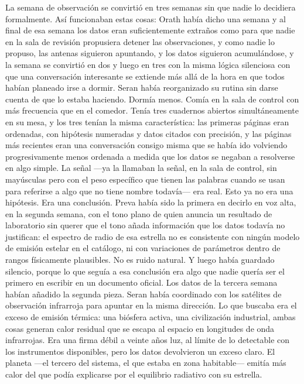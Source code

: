 \documentclass[11pt,a5paper,twoside]{book}
\begin{document}
La semana de observación se convirtió en tres semanas sin que nadie lo decidiera formalmente.
Así funcionaban estas cosas: Orath había dicho una semana y al final de esa semana los datos eran suficientemente extraños como para que nadie en la sala de revisión propusiera detener las observaciones, y como nadie lo propuso, las antenas siguieron apuntando, y los datos siguieron acumulándose, y la semana se convirtió en dos y luego en tres con la misma lógica silenciosa con que una conversación interesante se extiende más allá de la hora en que todos habían planeado irse a dormir.
Seran había reorganizado su rutina sin darse cuenta de que lo estaba haciendo. Dormía menos. Comía en la sala de control con más frecuencia que en el comedor. Tenía tres cuadernos abiertos simultáneamente en su mesa, y los tres tenían la misma característica: las primeras páginas eran ordenadas, con hipótesis numeradas y datos citados con precisión, y las páginas más recientes eran una conversación consigo misma que se había ido volviendo progresivamente menos ordenada a medida que los datos se negaban a resolverse en algo simple.
La señal —ya la llamaban la señal, en la sala de control, sin mayúsculas pero con el peso específico que tienen las palabras cuando se usan para referirse a algo que no tiene nombre todavía— era real.
Esto ya no era una hipótesis. Era una conclusión.
Preva había sido la primera en decirlo en voz alta, en la segunda semana, con el tono plano de quien anuncia un resultado de laboratorio sin querer que el tono añada información que los datos todavía no justifican: el espectro de radio de esa estrella no es consistente con ningún modelo de emisión estelar en el catálogo, ni con variaciones de parámetros dentro de rangos físicamente plausibles. No es ruido natural. Y luego había guardado silencio, porque lo que seguía a esa conclusión era algo que nadie quería ser el primero en escribir en un documento oficial.
Los datos de la tercera semana habían añadido la segunda pieza.
Seran había coordinado con los satélites de observación infrarroja para apuntar en la misma dirección. Lo que buscaba era el exceso de emisión térmica: una biósfera activa, una civilización industrial, ambas cosas generan calor residual que se escapa al espacio en longitudes de onda infrarrojas. Era una firma débil a veinte años luz, al límite de lo detectable con los instrumentos disponibles, pero los datos devolvieron un exceso claro. El planeta —el tercero del sistema, el que estaba en zona habitable— emitía más calor del que podía explicarse por el equilibrio radiativo con su estrella.
\end{document}
